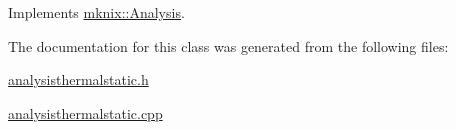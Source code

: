Implements \hyperlink{classmknix_1_1_analysis_a6dd7026a22ae11f3eef3dad3be370e70}{mknix\-::\-Analysis}.



The documentation for this class was generated from the following files\-:\begin{DoxyCompactItemize}
\item 
\hyperlink{analysisthermalstatic_8h}{analysisthermalstatic.\-h}\item 
\hyperlink{analysisthermalstatic_8cpp}{analysisthermalstatic.\-cpp}\end{DoxyCompactItemize}
